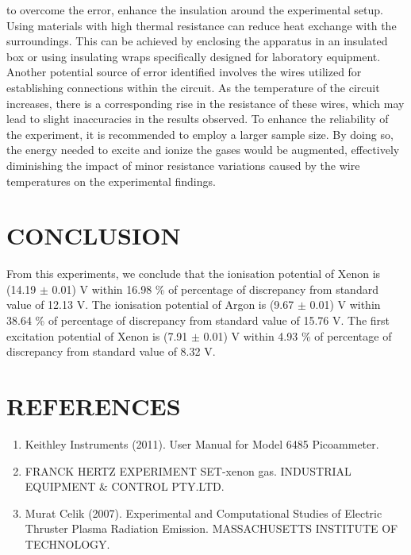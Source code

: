\documentclass[a4paper,11pt]{article}
\begin{document}
to overcome the error, enhance the insulation around the experimental setup. Using materials with high thermal resistance can reduce heat exchange with the surroundings. This can be achieved by enclosing the apparatus in an insulated box or using insulating wraps specifically designed for laboratory equipment.\\

Another potential source of error identified involves the wires utilized for establishing connections within the circuit. As the temperature of the circuit increases, there is a corresponding rise in the resistance of these wires, which may lead to slight inaccuracies in the results observed. To enhance the reliability of the experiment, it is recommended to employ a larger sample size. By doing so, the energy needed to excite and ionize the gases would be augmented, effectively diminishing the impact of minor resistance variations caused by the wire temperatures on the experimental findings.\\

\newpage
{}
\section*{\center  CONCLUSION}
\label{sec:CONCLUSION}
\quad From this experiments, we conclude that the ionisation potential of Xenon is (14.19 $\pm$ 0.01) V within 16.98 \% of percentage of discrepancy from standard value of 12.13 V. The ionisation potential of Argon is (9.67 $\pm$ 0.01) V within 38.64 \% of percentage of discrepancy from standard value of 15.76 V. The first excitation potential of Xenon is (7.91 $\pm$ 0.01) V within 4.93 \% of percentage of discrepancy from standard value of 8.32 V. 
\newpage
{}
\section*{\center REFERENCES}
\label{sec:REFERENCES}
\begin{enumerate}
    \item Keithley Instruments (2011). User Manual for Model 6485 Picoammeter.
    \item FRANCK HERTZ EXPERIMENT SET-xenon gas. INDUSTRIAL EQUIPMENT \& CONTROL PTY.LTD.
    \item Murat Celik (2007). Experimental and Computational Studies of Electric Thruster
Plasma Radiation Emission. MASSACHUSETTS INSTITUTE OF TECHNOLOGY.
\end{enumerate}
\end{document}
